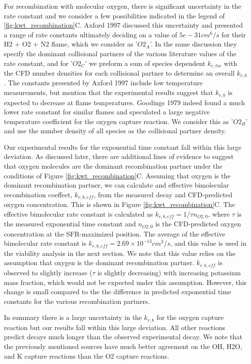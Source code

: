For recombination with molecular oxygen, there is significant uncertainty in the rate constant and we consider a few possibilities indicated in the legend of \ref{fig:kwt_recombination}C. Axford 1997 discussed this uncertainty and presented a range of rate constants ultimately deciding on a value of $5e-31 cm^6/s$ for their H2 + O2 + N2 flame, which we consider as '$O2_A$'. In the same discussion they specify the dominant collisional partners of the various literature values of the rate constant, and for '$O2_C$' we preform a sum of species dependent $k_{r,tm}$ with the CFD number densities for each collisional partner to determine an overall $k_{r,b}$. The constants presented by Axford 1997 include low temperature measurements, but mention that the experimental results suggest that $k_{r,b}$ is expected to decrease at flame temperatures. Goodings 1979 indeed found a much lower rate constant for similar flames and speculated a large negative temperature coefficient for the oxygen capture reaction. We consider this as '$O2_B$' and use the number density of all species as the collisional partner density.   

Our experimental results for the exponential time constant fall within this large deviation. As discussed later, there are additional lines of evidence to suggest that oxygen molecules are the dominant recombination partner under the conditions of Figure \ref{fig:kwt_recombination}C. Assuming that oxygen is the dominant recombination partner, we can calculate and effective bimolecular recombination coeffect, $k_{r,b,eff}$, from the measured decay and CFD-predicted oxygen concentration. This is shown in Figure \ref{fig:kwt_recombination}C. The effective bimolecular rate constant is calculated as $k_{r,b,eff} = 1/\tau n_{O2,0}$, where $\tau$ is the measured exponential time constant and $n_{O2,0}$ is the CFD-predicted oxygen concentration at the SFR-maximized position. The average of the effective bimolecular rate constant is $k_{r,b,eff} =  2.69 \times 10^{-13} cm^3/s$, and this value is used in the viability analysis in the next section. We note that this value relies on the assumption that oxygen is the dominant recombination partner. $k_{r,b,eff}$ is observed to slightly increase ($\tau$ is slightly decreasing) with increasing potassium mass fraction, which would not be expected under this assumption. However, this change is small compared to the the difference in predicted exponential time constants for the various recombination partners.

In summary there is a large uncertainty in the $k_{r,b}$ for the oxygen capture reaction but our results fall within this large deviation. All other reactions predict decays much longer than the observed experimental decay. We note that the previously mentioned sources have much better agreement on the OH, H2O, and K capture reactions than the O2 capture reactions. 





